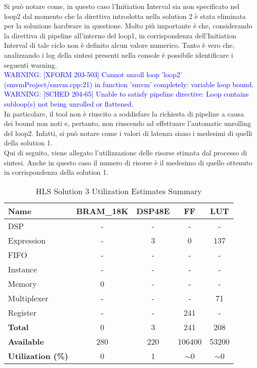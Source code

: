 Si può notare come, in questo caso l'Initiation Interval sia non specificato nel loop2 dal momento che la direttiva introdotta nella solution 2 è stata eliminata per la soluzione hardware in questione. Molto più importante è che, considerando la direttiva di pipeline all'interno del loop1, in corrispondenza dell'Initiation Interval di tale ciclo non è definito alcun valore numerico. Tanto è vero che, analizzando i log della sintesi presenti nella console è possibile identificare i seguenti warning.
\\
\textcolor{blue}{WARNING: [XFORM 203-503] Cannot unroll loop 'loop2' (smvmProject/smvm.cpp:21) in function 'smvm' completely: variable loop bound.}
\\
\textcolor{blue}{WARNING: [SCHED 204-65] Unable to satisfy pipeline directive: Loop contains subloop(s) not being unrolled or flattened.}
\\
In particolare, il tool non è riuscito a soddisfare la richiesta di pipeline a causa dei bound non noti e, pertanto, non riuscendo ad effettuare l'automatic unrolling del loop2. Infatti, si può notare come i valori di latenza siano i medesimi di quelli della solution 1. 
\\
Qui di seguito, viene allegato l'utilizzazione delle risorse stimata dal processo di sintesi. Anche in questo caso il numero di risorse è il medesimo di quello ottenuto in corrispondenza della solution 1.
\begin{table}[h]
	\centering
	\begin{tabular}{|l|c|c|c|c|}
		\hline
		\textbf{Name}    & \textbf{BRAM\_18K} & \textbf{DSP48E} & \textbf{FF} & \textbf{LUT} \\ \hline
		DSP              & -                   & -               & -           & -            \\ 
		Expression       & -                   & 3               & 0           & 137          \\ 
		FIFO             & -                   & -               & -           & -            \\ 
		Instance         & -                   & -               & -           & -            \\ 
		Memory           & 0                   & -               & -          & -            \\ 
		Multiplexer      & -                   & -               & -           & 71          \\ 
		Register         & -                   & -               & 241         & -            \\ \hline
		\textbf{Total}   & 0                   & 3               & 241         & 208          \\ \hline
		\textbf{Available} & 280               & 220             & 106400      & 53200        \\ \hline
		\textbf{Utilization (\%)} & 0            & 1               & $\sim$0     & $\sim$0      \\ \hline
	\end{tabular}
	\caption{HLS Solution 3 Utilization Estimates Summary}
	\label{tab:hls-solution-3-utilization-estimates-summary}
\end{table}

